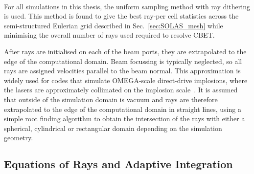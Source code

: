\paragraph*{}
For all simulations in this thesis, the uniform sampling method with ray dithering is used.
This method is found to give the best ray-per cell statistics across the semi-structured Eulerian grid described in Sec.~\ref{sec:SOLAS_mesh} while minimising the overall number of rays used required to resolve \ac{CBET}.

After rays are initialised on each of the beam ports, they are extrapolated to the edge of the computational domain.
Beam focussing is typically neglected, so all rays are assigned velocities parallel to the beam normal.
This approximation is widely used for codes that simulate OMEGA-scale direct-drive implosions, where the lasers are approximately collimated on the implosion scale~\cite{colaitis_inverse_2021,marozas_wavelength-detuning_2018}.
It is assumed that outside of the simulation domain is vacuum and rays are therefore extrapolated to the edge of the computational domain in straight lines, using a simple root finding algorithm to obtain the intersection of the rays with either a spherical, cylindrical or rectangular domain depending on the simulation geometry.

\subsection{Equations of Rays and Adaptive Integration}%
\label{sec:SOLAS_ray_propagation}

